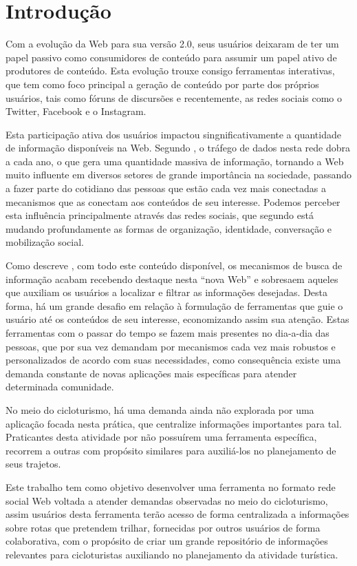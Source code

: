 \section{\esp Introdução}
Com a evolução da Web para sua versão 2.0, seus usuários deixaram de ter um papel passivo como consumidores de conteúdo para assumir
um papel ativo de produtores de conteúdo. Esta evolução trouxe consigo ferramentas interativas, que tem como foco principal a geração de 
conteúdo por parte dos próprios usuários, tais como fóruns de discursões e recentemente, as redes sociais como o Twitter, Facebook 
e o Instagram.

Esta participação ativa dos usuários impactou singnificativamente a quantidade de informação disponíveis na Web. Segundo \cite{artigo01}, 
o tráfego de dados nesta rede dobra a cada ano, o que gera uma quantidade massiva de informação, tornando a Web muito influente em diversos setores 
de grande importância na sociedade, passando a fazer parte do cotidiano das pessoas que estão cada vez mais conectadas a mecanismos que as 
conectam aos conteúdos de seu interesse. Podemos perceber esta influência principalmente através das redes sociais, que segundo 
\cite{redesSociais01} está mudando profundamente as formas de organização, identidade, conversação e mobilização social.

Como descreve \cite{deitelAjax}, com todo este conteúdo disponível, os mecanismos de busca de informação 
acabam recebendo destaque nesta ``nova Web'' e sobresaem aqueles que auxiliam os usuários  a localizar e filtrar 
as informações desejadas. Desta forma, há um grande desafio em relação à formulação de ferramentas que guie o usuário até os conteúdos de seu 
interesse, economizando assim sua atenção. Estas ferramentas com o passar do tempo se fazem mais presentes no dia-a-dia das pessoas, 
que por sua vez demandam por mecanismos cada vez mais robustos e personalizados de acordo com suas necessidades, como consequência existe 
uma demanda constante de novas aplicações mais específicas para atender determinada comunidade.

No meio do cicloturismo, há uma demanda ainda não explorada por uma aplicação focada nesta prática, que centralize informações 
importantes para tal. Praticantes desta atividade por não possuírem uma ferramenta específica, recorrem a outras com propósito similares 
para auxiliá-los no planejamento de seus trajetos.

Este trabalho tem como objetivo desenvolver uma ferramenta no formato rede social Web voltada a atender demandas observadas no meio do cicloturismo,
assim usuários desta ferramenta terão acesso de forma centralizada a informações sobre rotas que pretendem trilhar, fornecidas por outros usuários
de forma colaborativa, com o propósito de criar um grande repositório de informações relevantes para cicloturistas auxiliando no planejamento da 
atividade turística.